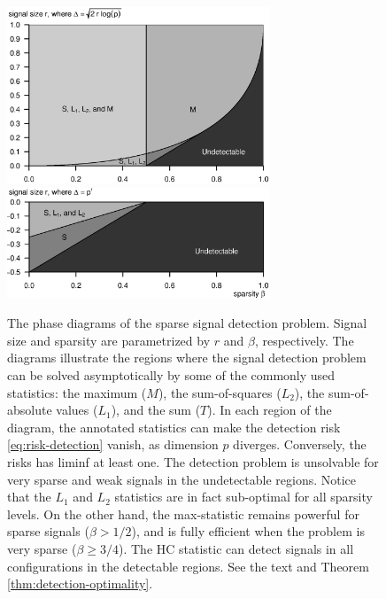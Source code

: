 \begin{figure}
      \centering
      \includegraphics[width=0.7\textwidth]{figures/phase_diagram_signal_detection.eps}
      \includegraphics[width=0.7\textwidth]{figures/phase_diagram_signal_detection_vanishing_signals.eps}
      \caption{The phase diagrams of the sparse signal detection problem. 
      Signal size and sparsity are parametrized by $r$ and $\beta$, respectively.
      The diagrams illustrate the regions where the signal detection problem can be solved asymptotically by some of the commonly used statistics: the maximum ($M$), the sum-of-squares ($L_2$), the sum-of-absolute values ($L_1$), and the sum ($T$).
      In each region of the diagram, the annotated statistics can make the detection risk \eqref{eq:risk-detection} vanish, as dimension $p$ diverges. Conversely, the risks has liminf at least one.
      The detection problem is unsolvable for very sparse and weak signals in the undetectable regions.
      Notice that the $L_1$ and $L_2$ statistics are in fact sub-optimal for all sparsity levels.
      On the other hand, the max-statistic remains powerful for sparse signals ($\beta>1/2$), and is fully efficient when the problem is very sparse ($\beta\ge3/4$).
      The \ac{HC} statistic can detect signals in all configurations in the detectable regions.
      See the text and Theorem \ref{thm:detection-optimality}.}
      \label{fig:phase-diagram-signal-detection}
\end{figure}


